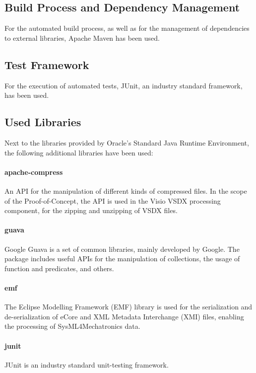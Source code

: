 \subsection{Build Process and Dependency Management}

For the automated build process, as well as for the management of dependencies to external libraries, Apache Maven has been used.

\subsection{Test Framework}

For the execution of automated tests, JUnit, an industry standard framework, has been used.

\subsection{Used Libraries}

Next to the libraries provided by Oracle's Standard Java Runtime Environment, the following additional libraries have been used:

\paragraph{apache-compress} An API for the manipulation of different kinds of compressed files. In the scope of the Proof-of-Concept, the API is used in the Visio VSDX processing component, for the zipping and unzipping of VSDX files.

\paragraph{guava} Google Guava is a set of common libraries, mainly developed by Google. The package includes useful APIs for the manipulation of collections, the usage of function and predicates, and others.

\paragraph{emf} The Eclipse Modelling Framework (EMF) library is used for the serialization and de-serialization of eCore and XML Metadata Interchange (XMI) files, enabling the processing of SysML4Mechatronics data.

\paragraph{junit} JUnit is an industry standard unit-testing framework.

